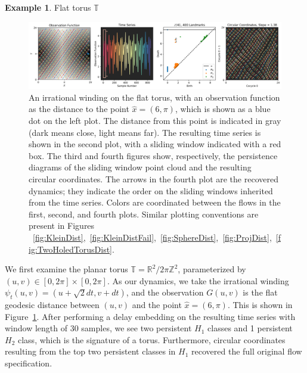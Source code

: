 \documentclass[11pt]{article}
\theoremstyle{definition}
\newtheorem{example}[theorem]{Example}
\theoremstyle{remark}
\newcommand{\RR}{\mathbb{R}}
\newcommand{\ZZ}{\mathbb{Z}}
\newcommand{\TT}{\mathbb{T}}
\begin{document}
    \begin{example}
    Flat torus $\TT$

    \begin{figure}[!htb]
        \centering
        \includegraphics[width=\textwidth]{TorusDist_400.png}
        \caption{An irrational winding on the flat torus, with an observation function as the distance to the point $\hat{x} = (6, \pi)$, which is shown as a blue dot on the left plot.  The distance from this point is indicated in gray (dark means close, light means far).  The resulting time series is shown in the second plot, with a sliding window indicated with a red box.  The third and fourth figures show, respectively, the persistence diagrams of the sliding window point cloud and the resulting circular coordinates.
        The arrows in the fourth plot are the recovered dynamics; they indicate the order on the sliding windows inherited from the time series.  Colors are coordinated between the flows in the first, second, and fourth plots.  Similar plotting conventions are present in Figures ~\ref{fig:KleinDist},~\ref{fig:KleinDistFail},~\ref{fig:SphereDist},~\ref{fig:ProjDist},~\ref{fig:TwoHoledTorusDist}.}
        \label{fig:TorusDist}
    \end{figure}

    We first examine the planar torus $\TT=\RR^2/2\pi\ZZ^2$, parameterized by $(u, v) \in [0, 2 \pi] \times [0, 2 \pi]$.  As our dynamics, we take the irrational winding  $\psi_t(u, v) = (u + \sqrt{2} dt, v + dt)$, and the observation $G(u, v)$ is the flat geodesic distance between $(u, v)$ and the point $\hat{x} = (6, \pi)$.  This is shown in Figure~\ref{fig:TorusDist}.  After performing a delay embedding on the resulting time series with window length of 30 samples, we see two persistent $H_1$ classes and 1 persistent $H_2$ class, which is the signature of a torus.  Furthermore, circular coordinates resulting from the top two persistent classes in $H_1$ recovered the full original flow specification.
    \end{example}
\end{document}
